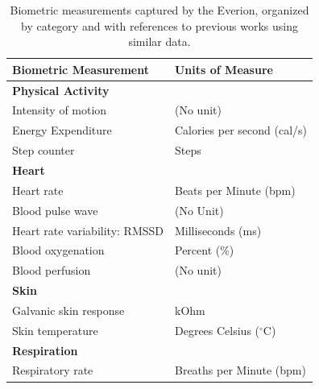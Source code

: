 \begin{table}[h!]
\begin{center}
\small\addtolength{\tabcolsep}{10pt}%
\begin{tabular}{l l}
\hline
Biometric Measurement & Units of Measure \\ 
\hline
\textbf{Physical Activity} & \cite{fox1999,aldana1996}\\
\hspace{3mm}Intensity of motion & (No unit)  \\
\hspace{3mm}Energy Expenditure & Calories per second (cal/s)  \\
\hspace{3mm}Step counter & Steps  \\
\hline
\textbf{Heart} & \cite{haapalainen2010psycho,healey2005detecting,mulder1992measurement,haag2004emotion} \\
\hspace{3mm}Heart rate & Beats per Minute (bpm) \\
\hspace{3mm}Blood pulse wave & (No Unit)  \\
\hspace{3mm}Heart rate variability: RMSSD  & Milliseconds (ms) \\
\hspace{3mm}Blood oxygenation  & Percent (\%)  \\
\hspace{3mm}Blood perfusion & (No unit)  \\
\hline
\textbf{Skin} & \cite{healey2005detecting,haag2004emotion} \\
\hspace{3mm}Galvanic skin response &  kOhm  \\
\hspace{3mm}Skin temperature &  Degrees Celsius ($^{\circ}$C)  \\
\hline
\textbf{Respiration} & \cite{mulder1992measurement,healey2005detecting,haag2004emotion,masaoka1997}\\
\hspace{3mm}Respiratory rate & Breaths per Minute (bpm)  \\
\hline
\end{tabular}
\caption{Biometric measurements captured by the Everion, organized by category and with references to previous works using similar data. }
\label{signals}
\end{center}
\end{table}

